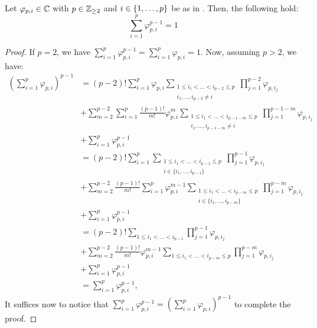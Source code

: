 \documentclass{article}
\begin{document}
    \begin{corollary} \label{cor:A-4}
      Let $\varphi_{p, i} \in \mathbb C$ with $p \in \mathbb{Z}_{\geq 2}$ and $i \in \{1, \dots, p\}$ be as in . Then, the following hold:
      \begin{equation} 
        \sum_{i=1}^p \varphi_{p, i}^{p-1} = 1
      \end{equation}
    \end{corollary}

    \begin{proof}
      If $p=2$, we have $\sum_{i=1}^p \varphi_{p, i}^{p-1} = \sum_{i=1}^p \varphi_{p, i} = 1$. Now, assuming $p > 2$, we have:
      \begin{align} 
        \left(\sum_{i=1}^p \varphi_{p, i} \right)^{p-1} 
        & = (p-2)! \sum_{i=1}^p \varphi_{p, i}
        \sum_{\substack{1 \leq i_1 < \dots < i_{p - 2} \leq p \\ i_1, \dots, i_{p-2} \neq i}} \prod_{j=1}^{p - 2} \varphi_{p, i_j} \\ 
        \nonumber & + \sum_{m=2}^{p-2} \sum_{i=1}^p \frac{(p-1)!}{m!} \varphi_{p, i}^m 
        \sum_{\substack{1 \leq i_1 < \dots < i_{p - 1 - m} \leq p \\ i_1, \dots, i_{p-1-m} \neq i}} 
        \prod_{j=1}^{p - 1 - m} \varphi_{p, i_j} \\
        \nonumber & + \sum_{i=1}^p \varphi_{p, i}^{p-1} \\
        & = (p-2)!
        \sum_{i=1}^p \sum_{\substack{1 \leq i_1 < \dots < i_{p - 1} \leq p \\ i \in \{i_1, \dots, i_{p-1}\}}} \prod_{j=1}^{p - 1} \varphi_{p, i_j} \\
        \nonumber & + \sum_{m=2}^{p-2} \frac{(p-1)!}{m!} \sum_{i=1}^p \varphi_{p, i}^{m-1} 
        \sum_{\substack{1 \leq i_1 < \dots < i_{p - m} \leq p \\ i \in \{i_1, \dots, i_{p-m}\}}} 
        \prod_{j=1}^{p - m} \varphi_{p, i_j} \\
        \nonumber & + \sum_{i=1}^p \varphi_{p, i}^{p-1} \\
        & = (p-2)!
        \sum_{1 \leq i_1 < \dots < i_{p - 1}} \prod_{j=1}^{p - 1} \varphi_{p, i_j} \\
        \nonumber & + \sum_{m=2}^{p-2} \frac{(p-1)!}{m!} \varphi_{p, i}^{m-1} 
        \sum_{1 \leq i_1 < \dots < i_{p - m} \leq p} 
        \prod_{j=1}^{p - m} \varphi_{p, i_j} \\
        \nonumber & + \sum_{i=1}^p \varphi_{p, i}^{p-1} \\
        & = \sum_{i=1}^{p} \varphi_{p, i}^{p-1},
      \end{align}
      It suffices now to notice that $\sum_{i=1}^{p} \varphi_{p, i}^{p-1} = \left(\sum_{i=1}^p \varphi_{p, i} \right)^{p-1}$ to complete 
      the proof.
    \end{proof}
\end{document}
